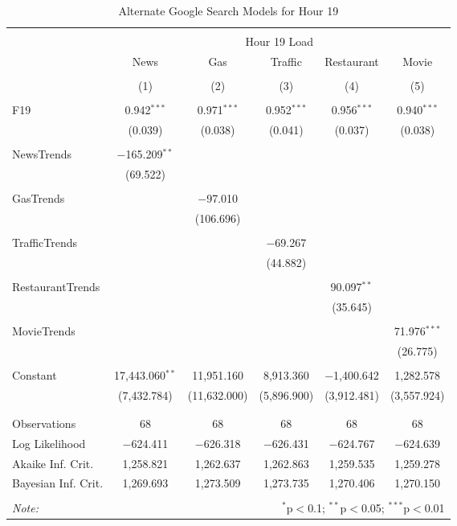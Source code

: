 \documentclass{article}
\begin{document}
\begin{table}[!htbp] \centering 
  \caption{Alternate Google Search Models for Hour 19} 
  \label{} 
\begin{tabular}{@{\extracolsep{5pt}}lccccc} 
\\[-1.8ex]\hline 
\hline \\[-1.8ex] 
 & \multicolumn{5}{c}{Hour 19 Load} \\ 
\cline{2-6} 
 & News & Gas & Traffic & Restaurant & Movie \\ 
\\[-1.8ex] & (1) & (2) & (3) & (4) & (5)\\ 
\hline \\[-1.8ex] 
 F19 & 0.942$^{***}$ & 0.971$^{***}$ & 0.952$^{***}$ & 0.956$^{***}$ & 0.940$^{***}$ \\ 
  & (0.039) & (0.038) & (0.041) & (0.037) & (0.038) \\ 
  & & & & & \\ 
 NewsTrends & $-$165.209$^{**}$ &  &  &  &  \\ 
  & (69.522) &  &  &  &  \\ 
  & & & & & \\ 
 GasTrends &  & $-$97.010 &  &  &  \\ 
  &  & (106.696) &  &  &  \\ 
  & & & & & \\ 
 TrafficTrends &  &  & $-$69.267 &  &  \\ 
  &  &  & (44.882) &  &  \\ 
  & & & & & \\ 
 RestaurantTrends &  &  &  & 90.097$^{**}$ &  \\ 
  &  &  &  & (35.645) &  \\ 
  & & & & & \\ 
 MovieTrends &  &  &  &  & 71.976$^{***}$ \\ 
  &  &  &  &  & (26.775) \\ 
  & & & & & \\ 
 Constant & 17,443.060$^{**}$ & 11,951.160 & 8,913.360 & $-$1,400.642 & 1,282.578 \\ 
  & (7,432.784) & (11,632.000) & (5,896.900) & (3,912.481) & (3,557.924) \\ 
  & & & & & \\ 
\hline \\[-1.8ex] 
Observations & 68 & 68 & 68 & 68 & 68 \\ 
Log Likelihood & $-$624.411 & $-$626.318 & $-$626.431 & $-$624.767 & $-$624.639 \\ 
Akaike Inf. Crit. & 1,258.821 & 1,262.637 & 1,262.863 & 1,259.535 & 1,259.278 \\ 
Bayesian Inf. Crit. & 1,269.693 & 1,273.509 & 1,273.735 & 1,270.406 & 1,270.150 \\ 
\hline 
\hline \\[-1.8ex] 
\textit{Note:}  & \multicolumn{5}{r}{$^{*}$p$<$0.1; $^{**}$p$<$0.05; $^{***}$p$<$0.01} \\ 
\end{tabular} 
\end{table} 
\end{document}
